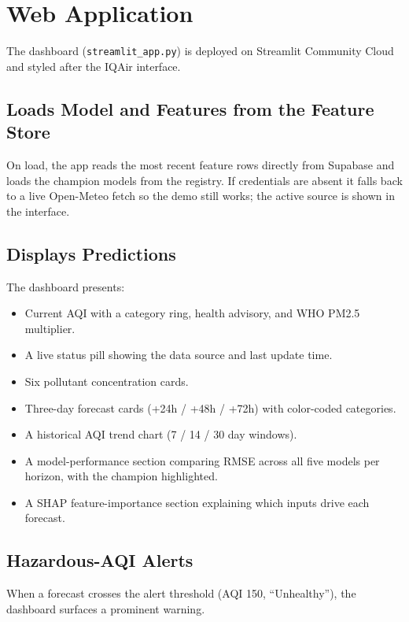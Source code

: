 \documentclass[11pt,a4paper]{article}
\begin{document}
\section{Web Application}
The dashboard (\texttt{streamlit\_app.py}) is deployed on Streamlit Community
Cloud and styled after the IQAir interface.

\subsection{Loads Model and Features from the Feature Store}
On load, the app reads the most recent feature rows directly from Supabase and
loads the champion models from the registry. If credentials are absent it falls
back to a live Open-Meteo fetch so the demo still works; the active source is
shown in the interface.

\subsection{Displays Predictions}
The dashboard presents:
\begin{itemize}[leftmargin=1.4em]
  \item Current AQI with a category ring, health advisory, and WHO PM2.5
        multiplier.
  \item A live status pill showing the data source and last update time.
  \item Six pollutant concentration cards.
  \item Three-day forecast cards (+24h / +48h / +72h) with color-coded
        categories.
  \item A historical AQI trend chart (7 / 14 / 30 day windows).
  \item A model-performance section comparing RMSE across all five models per
        horizon, with the champion highlighted.
  \item A SHAP feature-importance section explaining which inputs drive each
        forecast.
\end{itemize}

\subsection{Hazardous-AQI Alerts}
When a forecast crosses the alert threshold (AQI 150, ``Unhealthy''), the
dashboard surfaces a prominent warning.
\end{document}
